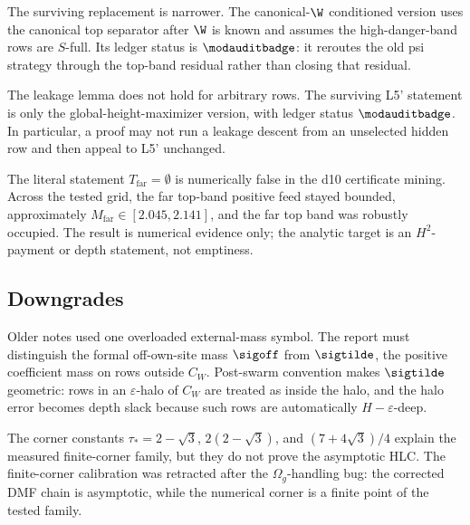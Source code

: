 The surviving replacement is narrower.  The canonical-\(\W\) conditioned version uses
the canonical top separator after \(\W\) is known and assumes the high-danger-band rows
are \(S\)-full.  Its ledger status is \(\modauditbadge\): it reroutes the old psi
strategy through the top-band residual rather than closing that residual.

\begin{refutedstatement}
 The leakage lemma does not hold for arbitrary rows.  The surviving L5'
statement is only the global-height-maximizer version, with ledger status
\(\modauditbadge\).  In particular, a proof may not run a leakage descent from an
unselected hidden row and then appeal to L5' unchanged.
\end{refutedstatement}

\begin{numericalresult}
\numbadge The literal statement \(T_{\mathrm{far}}=\emptyset\) is numerically false in
the d10 certificate mining.  Across the tested grid, the far top-band positive feed
stayed bounded, approximately \(M_{\mathrm{far}}\in[2.045,2.141]\), and the far top band
was robustly occupied.  The result is numerical evidence only; the analytic target is an
\(H^2\)-payment or depth statement, not emptiness.
\end{numericalresult}

\subsection{Downgrades}

\begin{downgradedstatement}[Sigma]
\downgradedbadge Older notes used one overloaded external-mass symbol.  The report must
distinguish the formal off-own-site mass \(\sigoff\) from \(\sigtilde\), the positive
coefficient mass on rows outside \(C_W\).  Post-swarm convention makes \(\sigtilde\) geometric:
rows in an \(\varepsilon\)-halo of \(C_W\) are treated as inside the halo, and the halo
error becomes depth slack because such rows are automatically \(H-\varepsilon\)-deep.
\end{downgradedstatement}

\begin{downgradedstatement}
\downgradedbadge The corner constants
\(\tau_*=2-\sqrt3\), \(2(2-\sqrt3)\), and \((7+4\sqrt3)/4\) explain the measured
finite-corner family, but they do not prove the asymptotic HLC.  The finite-corner
calibration was retracted after the \(\Omega_g\)-handling bug: the corrected DMF chain is
asymptotic, while the numerical corner is a finite point of the tested family.
\end{downgradedstatement}

